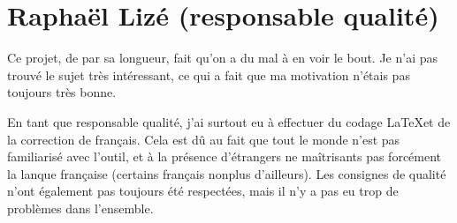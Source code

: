 \section{Raphaël Lizé (responsable qualité)}

Ce projet, de par sa longueur, fait qu'on a du mal à en voir
le bout. Je n'ai pas trouvé le sujet très intéressant, ce qui
a fait que ma motivation n'étais pas toujours très bonne.


En tant que responsable qualité, j'ai surtout eu à effectuer
du codage \LaTeX et de la correction de français. Cela est dû
au fait que tout le monde n'est pas familiarisé avec l'outil,
et à la présence d'étrangers ne maîtrisants pas forcément
la lanque française (certains français nonplus d'ailleurs).
Les consignes de qualité n'ont également pas toujours été respectées,
mais il n'y a pas eu trop de problèmes dans l'ensemble.
